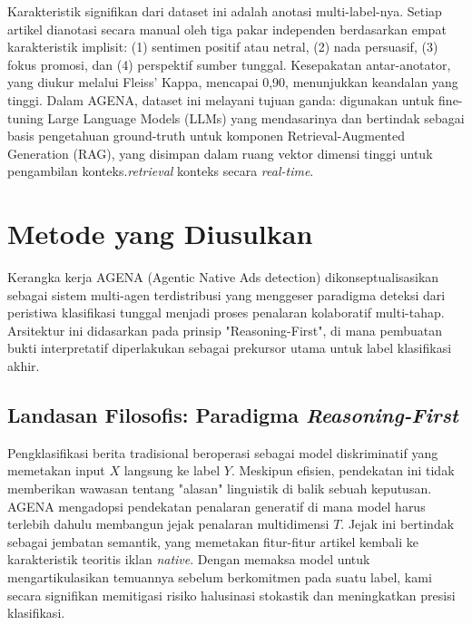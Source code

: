 \documentclass{ieeeaccess}
\begin{document}
Karakteristik signifikan dari dataset ini adalah anotasi multi-label-nya. Setiap artikel dianotasi secara manual oleh tiga pakar independen berdasarkan empat karakteristik implisit: (1) sentimen positif atau netral, (2) nada persuasif, (3) fokus promosi, dan (4) perspektif sumber tunggal. Kesepakatan antar-anotator, yang diukur melalui Fleiss' Kappa, mencapai 0,90, menunjukkan keandalan yang tinggi. Dalam AGENA, dataset ini melayani tujuan ganda: digunakan untuk fine-tuning Large Language Models (LLMs) yang mendasarinya dan bertindak sebagai basis pengetahuan ground-truth untuk komponen Retrieval-Augmented Generation (RAG), yang disimpan dalam ruang vektor dimensi tinggi untuk pengambilan konteks.\textit{retrieval} konteks secara \textit{real-time}.

\section{Metode yang Diusulkan}
\label{sec:methods}
Kerangka kerja AGENA (Agentic Native Ads detection) dikonseptualisasikan sebagai sistem multi-agen terdistribusi yang menggeser paradigma deteksi dari peristiwa klasifikasi tunggal menjadi proses penalaran kolaboratif multi-tahap. Arsitektur ini didasarkan pada prinsip "Reasoning-First", di mana pembuatan bukti interpretatif diperlakukan sebagai prekursor utama untuk label klasifikasi akhir.

\subsection{Landasan Filosofis: Paradigma \textit{Reasoning-First}}
Pengklasifikasi berita tradisional beroperasi sebagai model diskriminatif yang memetakan input $X$ langsung ke label $Y$. Meskipun efisien, pendekatan ini tidak memberikan wawasan tentang "alasan" linguistik di balik sebuah keputusan. AGENA mengadopsi pendekatan penalaran generatif di mana model harus terlebih dahulu membangun jejak penalaran multidimensi $T$. Jejak ini bertindak sebagai jembatan semantik, yang memetakan fitur-fitur artikel kembali ke karakteristik teoritis iklan \textit{native}. Dengan memaksa model untuk mengartikulasikan temuannya sebelum berkomitmen pada suatu label, kami secara signifikan memitigasi risiko halusinasi stokastik dan meningkatkan presisi klasifikasi.
\end{document}
